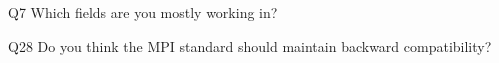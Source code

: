 \begin{description}%
\item{Q7} Which fields are you mostly working in?%
\item{Q28} Do you think the MPI standard should maintain backward compatibility?%
\end{description}%
